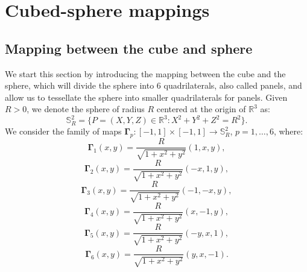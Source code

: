 \newpage
\section{Cubed-sphere mappings}
\label{cs-mappings}
\subsection{Mapping between the cube and sphere}
\label{equidistant-cs}
We start this section by introducing the mapping between the cube and the sphere, which will divide the sphere into 6 quadrilaterals, also called panels, and allow us to tessellate the sphere into smaller quadrilaterals for panels.
Given $R>0$, we denote the sphere of radius $R$ 
centered at the origin of  $\mathbb{R}^3$ as:
\begin{equation*}
	\mathbb{S}^2_R = \{ P = (X,Y,Z) \in \mathbb{R}^3: X^2 + Y^2 + Z^2 = R^2\}.
\end{equation*}
We consider %
the family of maps
$\boldsymbol{\Gamma}_{p}: [-1,1] \times [-1,1] \to \mathbb{S}^2_R$, $p=1, \ldots, 6$,
where:
\begin{equation*}
	\boldsymbol{\Gamma}_{1}(x,y) = \frac{R}{\sqrt{1 + x^2 + y^2}}(1, x, y), 
\end{equation*}
\begin{equation*}
	\boldsymbol{\Gamma}_{2}(x,y) = \frac{R}{\sqrt{1 + x^2 + y^2}}(-x, 1, y), 
\end{equation*}
\begin{equation*}
	\boldsymbol{\Gamma}_{3}(x,y) = \frac{R}{\sqrt{1 + x^2 + y^2}}(-1, -x, y), 
\end{equation*}
\begin{equation*}
	\boldsymbol{\Gamma}_{4}(x,y) = \frac{R}{\sqrt{1 + x^2 + y^2}}(x, -1, y), 
\end{equation*}
\begin{equation*}
	\boldsymbol{\Gamma}_{5}(x,y) = \frac{R}{\sqrt{1 + x^2 + y^2}}(-y, x, 1), 
\end{equation*}
\begin{equation*}
	\boldsymbol{\Gamma}_{6}(x,y) = \frac{R}{\sqrt{1 + x^2 + y^2}}(y, x, -1).
\end{equation*}


